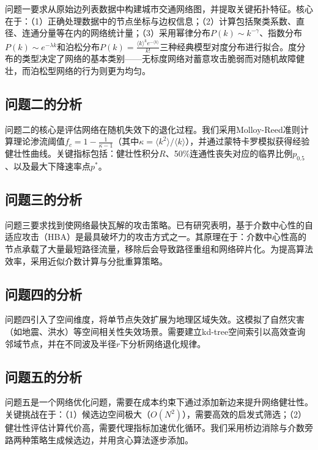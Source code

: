 \documentclass[12pt,a4paper]{article}
\begin{document}
问题一要求从原始边列表数据中构建城市交通网络图，并提取关键拓扑特征。核心在于：（1）正确处理数据中的节点坐标与边权信息；（2）计算包括聚类系数、直径、连通分量等在内的网络统计量；（3）采用幂律分布$P(k)\sim k^{-\gamma}$、指数分布$P(k)\sim e^{-\lambda k}$和泊松分布$P(k)=\frac{\langle k\rangle^k e^{-\langle k\rangle}}{k!}$三种经典模型对度分布进行拟合。度分布的类型决定了网络的基本类别——无标度网络对蓄意攻击脆弱而对随机故障健壮，而泊松型网络的行为则更为均匀。

\subsection{问题二的分析}

问题二的核心是评估网络在随机失效下的退化过程。我们采用Molloy-Reed准则计算理论渗流阈值$f_c = 1 - \frac{1}{\kappa - 1}$（其中$\kappa = \langle k^2 \rangle / \langle k \rangle$），并通过蒙特卡罗模拟获得经验健壮性曲线。关键指标包括：健壮性积分$R$、50\%连通性丧失对应的临界比例$p_{0.5}$、以及最大下降速率点$p^*$。

\subsection{问题三的分析}

问题三要求找到使网络最快瓦解的攻击策略。已有研究表明，基于介数中心性的自适应攻击（HBA）是最具破坏力的攻击方式之一。其原理在于：介数中心性高的节点承载了大量最短路径流量，移除后会导致路径重组和网络碎片化。为提高算法效率，采用近似介数计算与分批重算策略。

\subsection{问题四的分析}

问题四引入了空间维度，将单节点失效扩展为地理区域失效。这模拟了自然灾害（如地震、洪水）等空间相关性失效场景。需要建立kd-tree空间索引以高效查询邻域节点，并在不同波及半径$r$下分析网络退化规律。

\subsection{问题五的分析}

问题五是一个网络优化问题，需要在成本约束下通过添加新边来提升网络健壮性。关键挑战在于：（1）候选边空间极大（$O(N^2)$），需要高效的启发式筛选；（2）健壮性评估计算代价高，需要代理指标加速优化循环。我们采用桥边消除与介数旁路两种策略生成候选边，并用贪心算法逐步添加。

\end{document}
